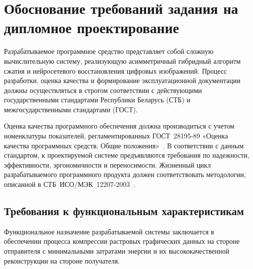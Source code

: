 \section{Обоснование требований задания на дипломное проектирование}

Разрабатываемое программное средство представляет собой сложную вычислительную систему, реализующую асимметричный гибридный алгоритм сжатия и нейросетевого восстановления цифровых изображений. Процесс разработки, оценка качества и формирование эксплуатационной документации должны осуществляться в строгом соответствии с действующими государственными стандартами Республики Беларусь (СТБ) и межгосударственными стандартами (ГОСТ).

Оценка качества программного обеспечения должна производиться с учетом номенклатуры показателей, регламентированных ГОСТ~28195-89 «Оценка качества программных средств. Общие положения»~\cite{gost_28195_89}. В соответствии с данным стандартом, к проектируемой системе предъявляются требования по надежности, эффективности, эргономичности и переносимости. Жизненный цикл разрабатываемого программного продукта должен соответствовать методологии, описанной в СТБ~ИСО/МЭК~12207-2003~\cite{stb_iso_12207}.

\subsection{Требования к функциональным характеристикам}

Функциональное назначение разрабатываемой системы заключается в обеспечении процесса компрессии растровых графических данных на стороне отправителя с минимальными затратами энергии и их высококачественной реконструкции на стороне получателя.

